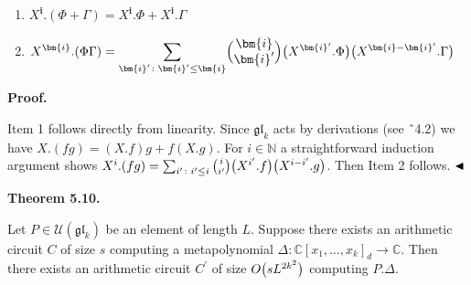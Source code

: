 \documentclass[10pt,a4paper]{article}
\begin{document}
\begin{enumerate}


\item 
 


$X^{\bm{i}}.(\Phi+\Gamma)=X^{\bm{i}}.\Phi+X^{\bm{i}}.\Gamma$





\item 
 


$\displaystyle X^{\bm{i}}.(\Phi\Gamma)=\sum_{{\bm{i}}^{\prime}\colon{\bm{i}}^{\prime}\leq{\bm{i}}}\Bigl{(}\begin{array}[]{@{}c@{}}{\bm{i}}\\ {\bm{i}}^{\prime}\end{array}\Bigr{)}\big{(}X^{{\bm{i}}^{\prime}}.\Phi\big{)}\big{(}X^{{\bm{i}}-{\bm{i}}^{\prime}}.\Gamma\big{)}$





\end{enumerate}





\par\medskip\noindent\textbf{Proof.}\par




Item 1 follows directly from linearity.
Since $\mathfrak{gl}_{k}$ acts by derivations (see ˜4.2) we have $X.(fg)=(X.f)g+f(X.g)$.
For $i\in\mathbb{N}$ a straightforward induction argument shows $X^{i}.(fg)=\sum_{i^{\prime}\colon i^{\prime}\leq i}\binom{i}{i^{\prime}}\big{(}X^{i^{\prime}}.f\big{)}\big{(}X^{i-i^{\prime}}.g\big{)}$. Then Item 2 follows.
$\hfill\blacktriangleleft$





\par\medskip\noindent\textbf{Theorem 5.10.}\par



Let $P\in\mathcal{U}(\mathfrak{gl}_{k})$ be an element of length $L$.
Suppose there exists an arithmetic circuit $C$ of size $s$ computing a metapolynomial
$\Delta\colon\mathbb{C}[x_{1},\ldots,x_{k}]_{d}\to\mathbb{C}$.
Then there exists an arithmetic circuit $C^{\prime}$ of size $O\big{(}sL^{2k^{2}}\big{)}$ computing $P.\Delta$.
\end{document}
